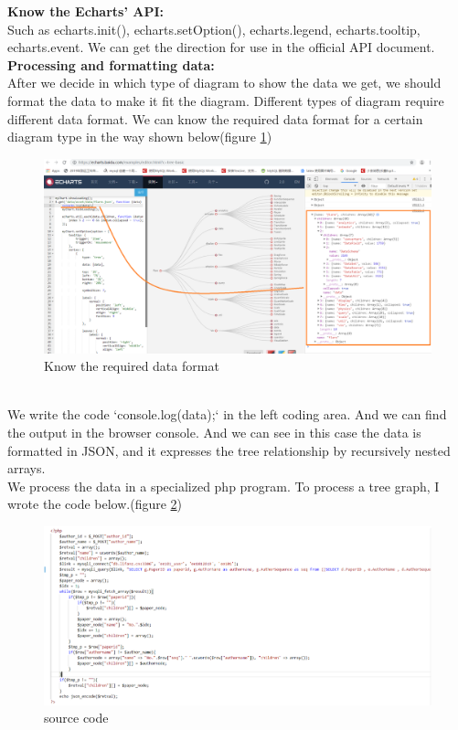 \documentclass{article}
\begin{document}
	\noindent\textbf{Know the Echarts' API:}\\
	\indent Such as echarts.init(), echarts.setOption(), echarts.legend, echarts.tooltip, echarts.event. We can get the direction for use in the official API document.\\
	\noindent\textbf{Processing and formatting data:}\\
	\indent After we decide in which type of diagram to show the data we get, we should format the data to make it fit the diagram. Different types of diagram require different data format. We can know the required data format for a certain diagram type in the way shown below(figure \ref{dataformat})
	\begin{figure}[!h]
		\includegraphics[width=1.0\textwidth]{formatdata.png}
		\caption{Know the required data format}
		\label{dataformat}
	\end{figure}\\
	\indent We write the code `console.log(data);` in the left coding area. And we can find the output in the browser console. And we can see in this case the data is formatted in JSON, and it expresses the tree relationship by recursively nested arrays.\\
	\indent We process the data in a specialized php program. To process a tree graph, I wrote the code below.(figure \ref{Tree graph code})
	\begin{figure}[!h]
		\includegraphics[width=1.0\textwidth]{treegraphcode.png}
		\caption{source code}
		\label{Tree graph code}
	\end{figure}\\
\end{document}
